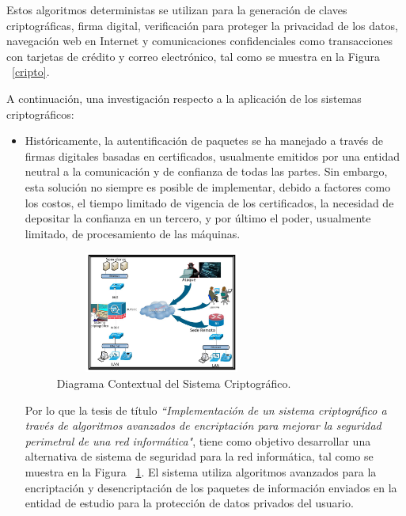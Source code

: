 \documentclass[10pt,journal]{IEEEtran}
\begin{document}
     Estos algoritmos deterministas se utilizan para la generación de claves criptográficas, firma digital, verificación para proteger la privacidad de los datos, navegación web en Internet y comunicaciones confidenciales como transacciones con tarjetas de crédito y correo electrónico, tal como se muestra en la Figura ~\ref{cripto}.
    
    A continuación, una investigación respecto a la aplicación de los sistemas criptográficos:
    \begin{itemize}
        \item Históricamente, la autentificación de paquetes se ha manejado a través de firmas digitales basadas en certificados, usualmente emitidos por una entidad neutral a la comunicación y de confianza de todas las partes. Sin embargo, esta solución no siempre es posible de implementar, debido a factores como los costos, el tiempo limitado de vigencia de los certificados, la necesidad de depositar la confianza en un tercero, y por último el poder, usualmente limitado, de procesamiento de las máquinas.
            
    \begin{figure}[H]
      \begin{center}
        \includegraphics[width=7cm, height=4cm]{figuras/criptoinv.PNG}
        \caption{Diagrama Contextual del Sistema Criptográfico.}
        \label{criptoinv} 
        \end{center}
    \end{figure}
        
        Por lo que la tesis de título \textit{“Implementación de un sistema criptográfico a través de algoritmos avanzados de encriptación para mejorar la seguridad perimetral de una red informática"}, \citep{guevara} tiene como objetivo desarrollar una alternativa de sistema de seguridad para la red informática, tal como se muestra en la Figura ~\ref{criptoinv}. El sistema utiliza algoritmos avanzados para la encriptación y desencriptación de los paquetes de información enviados en la entidad de estudio para la protección de datos privados del usuario. 
        

\end{itemize}
\end{document}
